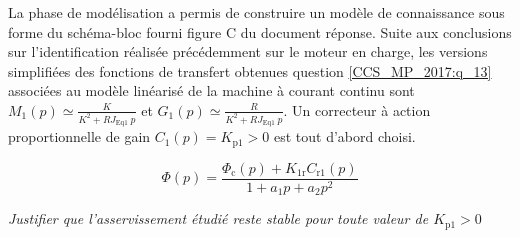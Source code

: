 La phase de modélisation a permis de construire un modèle de connaissance sous forme du schéma-bloc fourni figure C du document réponse. Suite aux conclusions sur l'identification réalisée précédemment sur le moteur en charge, les versions simplifiées des fonctions de transfert obtenues question \ref{CCS_MP_2017:q_13} associées au modèle linéarisé de la machine à courant continu sont $M_{1}(p) \simeq \frac{K}{K^{2}+R J_{\text {Eq1 }} p}$ et $G_{1}(p) \simeq \frac{R}{K^{2}+R J_{\text {Eq1 }} p}$.
Un correcteur à action proportionnelle de gain $C_{1}(p)=K_{\mathrm{p} 1}>0$ est tout d'abord choisi.
\fi


$$
\Phi(p)=\frac{\Phi_{\mathrm{c}}(p)+K_{1 \mathrm{r}} C_{\mathrm{r} 1}(p)}{1+a_{1} p+a_{2} p^{2}}
$$

\textit{Justifier que l'asservissement étudié reste stable pour toute valeur de $K_{\mathrm{p} 1}>0$}

